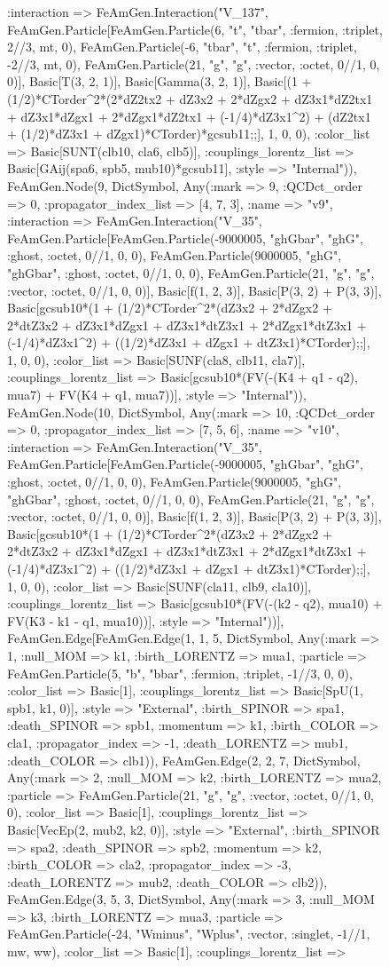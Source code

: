 \documentclass{revtex4}
\begin{document}
\begin{figure}[!htb]
\begin{center}
{:interaction => FeAmGen.Interaction("V_137", FeAmGen.Particle[FeAmGen.Particle(6, "t", "tbar", :fermion, :triplet, 2//3, mt, 0), FeAmGen.Particle(-6, "tbar", "t", :fermion, :triplet, -2//3, mt, 0), FeAmGen.Particle(21, "g", "g", :vector, :octet, 0//1, 0, 0)], Basic[T(3, 2, 1)], Basic[Gamma(3, 2, 1)], Basic[(1 + (1/2)*CTorder^2*(2*dZ2tx2 + dZ3x2 + 2*dZgx2 + dZ3x1*dZ2tx1 + dZ3x1*dZgx1 + 2*dZgx1*dZ2tx1 + (-1/4)*dZ3x1^2) + (dZ2tx1 + (1/2)*dZ3x1 + dZgx1)*CTorder)*gcsub11;;], 1, 0, 0), :color_list => Basic[SUNT(clb10, cla6, clb5)], :couplings_lorentz_list => Basic[GAij(spa6, spb5, mub10)*gcsub11], :style => "Internal")), FeAmGen.Node(9, Dict{Symbol, Any}(:mark => 9, :QCDct_order => 0, :propagator_index_list => [4, 7, 3], :name => "v9", :interaction => FeAmGen.Interaction("V_35", FeAmGen.Particle[FeAmGen.Particle(-9000005, "ghGbar", "ghG", :ghost, :octet, 0//1, 0, 0), FeAmGen.Particle(9000005, "ghG", "ghGbar", :ghost, :octet, 0//1, 0, 0), FeAmGen.Particle(21, "g", "g", :vector, :octet, 0//1, 0, 0)], Basic[f(1, 2, 3)], Basic[P(3, 2) + P(3, 3)], Basic[gcsub10*(1 + (1/2)*CTorder^2*(dZ3x2 + 2*dZgx2 + 2*dtZ3x2 + dZ3x1*dZgx1 + dZ3x1*dtZ3x1 + 2*dZgx1*dtZ3x1 + (-1/4)*dZ3x1^2) + ((1/2)*dZ3x1 + dZgx1 + dtZ3x1)*CTorder);;], 1, 0, 0), :color_list => Basic[SUNF(cla8, clb11, cla7)], :couplings_lorentz_list => Basic[gcsub10*(FV(-(K4 + q1 - q2), mua7) + FV(K4 + q1, mua7))], :style => "Internal")), FeAmGen.Node(10, Dict{Symbol, Any}(:mark => 10, :QCDct_order => 0, :propagator_index_list => [7, 5, 6], :name => "v10", :interaction => FeAmGen.Interaction("V_35", FeAmGen.Particle[FeAmGen.Particle(-9000005, "ghGbar", "ghG", :ghost, :octet, 0//1, 0, 0), FeAmGen.Particle(9000005, "ghG", "ghGbar", :ghost, :octet, 0//1, 0, 0), FeAmGen.Particle(21, "g", "g", :vector, :octet, 0//1, 0, 0)], Basic[f(1, 2, 3)], Basic[P(3, 2) + P(3, 3)], Basic[gcsub10*(1 + (1/2)*CTorder^2*(dZ3x2 + 2*dZgx2 + 2*dtZ3x2 + dZ3x1*dZgx1 + dZ3x1*dtZ3x1 + 2*dZgx1*dtZ3x1 + (-1/4)*dZ3x1^2) + ((1/2)*dZ3x1 + dZgx1 + dtZ3x1)*CTorder);;], 1, 0, 0), :color_list => Basic[SUNF(cla11, clb9, cla10)], :couplings_lorentz_list => Basic[gcsub10*(FV(-(k2 - q2), mua10) + FV(K3 - k1 - q1, mua10))], :style => "Internal"))], FeAmGen.Edge[FeAmGen.Edge(1, 1, 5, Dict{Symbol, Any}(:mark => 1, :null_MOM => k1, :birth_LORENTZ => mua1, :particle => FeAmGen.Particle(5, "b", "bbar", :fermion, :triplet, -1//3, 0, 0), :color_list => Basic[1], :couplings_lorentz_list => Basic[SpU(1, spb1, k1, 0)], :style => "External", :birth_SPINOR => spa1, :death_SPINOR => spb1, :momentum => k1, :birth_COLOR => cla1, :propagator_index => -1, :death_LORENTZ => mub1, :death_COLOR => clb1)), FeAmGen.Edge(2, 2, 7, Dict{Symbol, Any}(:mark => 2, :null_MOM => k2, :birth_LORENTZ => mua2, :particle => FeAmGen.Particle(21, "g", "g", :vector, :octet, 0//1, 0, 0), :color_list => Basic[1], :couplings_lorentz_list => Basic[VecEp(2, mub2, k2, 0)], :style => "External", :birth_SPINOR => spa2, :death_SPINOR => spb2, :momentum => k2, :birth_COLOR => cla2, :propagator_index => -3, :death_LORENTZ => mub2, :death_COLOR => clb2)), FeAmGen.Edge(3, 5, 3, Dict{Symbol, Any}(:mark => 3, :null_MOM => k3, :birth_LORENTZ => mua3, :particle => FeAmGen.Particle(-24, "Wminus", "Wplus", :vector, :singlet, -1//1, mw, ww), :color_list => Basic[1], :couplings_lorentz_list => }
\end{center}
\end{figure}
\end{document}
